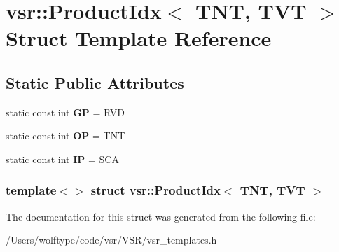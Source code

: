 \hypertarget{structvsr_1_1_product_idx_3_01_t_n_t_00_01_t_v_t_01_4}{\section{vsr\-:\-:Product\-Idx$<$ T\-N\-T, T\-V\-T $>$ Struct Template Reference}
\label{structvsr_1_1_product_idx_3_01_t_n_t_00_01_t_v_t_01_4}
}
\subsection*{Static Public Attributes}
\begin{DoxyCompactItemize}
\item 
\hypertarget{structvsr_1_1_product_idx_3_01_t_n_t_00_01_t_v_t_01_4_a083f75e31bc07f26a4339e42485f5c28}{static const int {\bfseries G\-P} = R\-V\-D}\label{structvsr_1_1_product_idx_3_01_t_n_t_00_01_t_v_t_01_4_a083f75e31bc07f26a4339e42485f5c28}

\item 
\hypertarget{structvsr_1_1_product_idx_3_01_t_n_t_00_01_t_v_t_01_4_aa35e0a1c6f63f13e9b8c4f65d2e0ddca}{static const int {\bfseries O\-P} = T\-N\-T}\label{structvsr_1_1_product_idx_3_01_t_n_t_00_01_t_v_t_01_4_aa35e0a1c6f63f13e9b8c4f65d2e0ddca}

\item 
\hypertarget{structvsr_1_1_product_idx_3_01_t_n_t_00_01_t_v_t_01_4_af0078b344ea4deeeef4e447572aaec93}{static const int {\bfseries I\-P} = S\-C\-A}\label{structvsr_1_1_product_idx_3_01_t_n_t_00_01_t_v_t_01_4_af0078b344ea4deeeef4e447572aaec93}

\end{DoxyCompactItemize}
\subsubsection*{template$<$$>$ struct vsr\-::\-Product\-Idx$<$ T\-N\-T, T\-V\-T $>$}



The documentation for this struct was generated from the following file\-:\begin{DoxyCompactItemize}
\item 
/\-Users/wolftype/code/vsr/\-V\-S\-R/vsr\-\_\-templates.\-h\end{DoxyCompactItemize}
